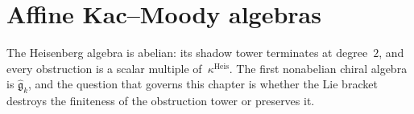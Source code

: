 \providecommand{\BRST}{\mathrm{BRST}}
\providecommand{\BRSTGauged}{\mathrm{BRSTGaugedChirAlg}}

\chapter{Affine Kac--Moody algebras}\label{chap:kac-moody-koszul}
\label{chap:kac-moody}

The Heisenberg algebra is abelian: its shadow tower terminates at
degree~$2$, and every obstruction is a scalar multiple of~$\kappa^{\mathrm{Heis}}$.
The first nonabelian chiral algebra is
$\widehat{\mathfrak{g}}_k$, and the question that
governs this chapter is whether the Lie bracket destroys the
finiteness of the obstruction tower or preserves it.

